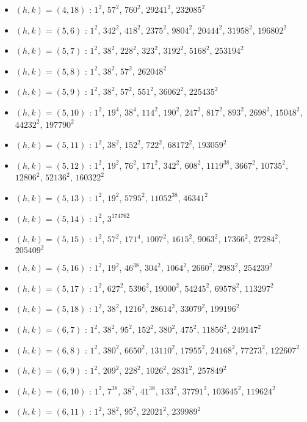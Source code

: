\begin{itemize}
\item $(h,k)=(4,18)$ : $1^{2}$, $57^{2}$, $760^{2}$, $29241^{2}$, $232085^{2}$
\item $(h,k)=(5,6)$ : $1^{2}$, $342^{2}$, $418^{2}$, $2375^{2}$, $9804^{2}$, $20444^{2}$, $31958^{2}$, $196802^{2}$
\item $(h,k)=(5,7)$ : $1^{2}$, $38^{2}$, $228^{2}$, $323^{2}$, $3192^{2}$, $5168^{2}$, $253194^{2}$
\item $(h,k)=(5,8)$ : $1^{2}$, $38^{2}$, $57^{2}$, $262048^{2}$
\item $(h,k)=(5,9)$ : $1^{2}$, $38^{2}$, $57^{2}$, $551^{2}$, $36062^{2}$, $225435^{2}$
\item $(h,k)=(5,10)$ : $1^{2}$, $19^{4}$, $38^{4}$, $114^{2}$, $190^{2}$, $247^{2}$, $817^{2}$, $893^{2}$, $2698^{2}$, $15048^{2}$, $44232^{2}$, $197790^{2}$
\item $(h,k)=(5,11)$ : $1^{2}$, $38^{2}$, $152^{2}$, $722^{2}$, $68172^{2}$, $193059^{2}$
\item $(h,k)=(5,12)$ : $1^{2}$, $19^{2}$, $76^{2}$, $171^{2}$, $342^{2}$, $608^{2}$, $1119^{38}$, $3667^{2}$, $10735^{2}$, $12806^{2}$, $52136^{2}$, $160322^{2}$
\item $(h,k)=(5,13)$ : $1^{2}$, $19^{2}$, $5795^{2}$, $11052^{38}$, $46341^{2}$
\item $(h,k)=(5,14)$ : $1^{2}$, $3^{174762}$
\item $(h,k)=(5,15)$ : $1^{2}$, $57^{2}$, $171^{4}$, $1007^{2}$, $1615^{2}$, $9063^{2}$, $17366^{2}$, $27284^{2}$, $205409^{2}$
\item $(h,k)=(5,16)$ : $1^{2}$, $19^{2}$, $46^{38}$, $304^{2}$, $1064^{2}$, $2660^{2}$, $2983^{2}$, $254239^{2}$
\item $(h,k)=(5,17)$ : $1^{2}$, $627^{2}$, $5396^{2}$, $19000^{2}$, $54245^{2}$, $69578^{2}$, $113297^{2}$
\item $(h,k)=(5,18)$ : $1^{2}$, $38^{2}$, $1216^{2}$, $28614^{2}$, $33079^{2}$, $199196^{2}$
\item $(h,k)=(6,7)$ : $1^{2}$, $38^{2}$, $95^{2}$, $152^{2}$, $380^{2}$, $475^{2}$, $11856^{2}$, $249147^{2}$
\item $(h,k)=(6,8)$ : $1^{2}$, $380^{2}$, $6650^{2}$, $13110^{2}$, $17955^{2}$, $24168^{2}$, $77273^{2}$, $122607^{2}$
\item $(h,k)=(6,9)$ : $1^{2}$, $209^{2}$, $228^{2}$, $1026^{2}$, $2831^{2}$, $257849^{2}$
\item $(h,k)=(6,10)$ : $1^{2}$, $7^{38}$, $38^{2}$, $41^{38}$, $133^{2}$, $37791^{2}$, $103645^{2}$, $119624^{2}$
\item $(h,k)=(6,11)$ : $1^{2}$, $38^{2}$, $95^{2}$, $22021^{2}$, $239989^{2}$

\end{itemize}
